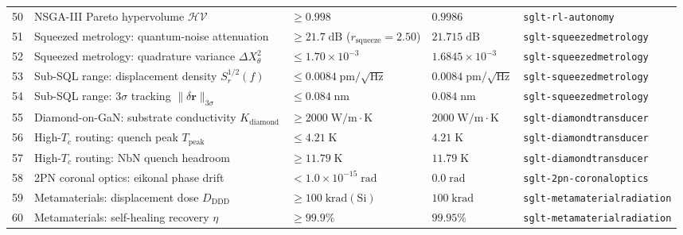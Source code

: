 \documentclass[10pt,twocolumn]{IEEEtran}
\begin{document}
\begin{table}[t]
\begin{tabular}{@{}cp{4.3cm}p{3.5cm}p{3.3cm}p{3.6cm}@{}}
50 & NSGA-III Pareto hypervolume $\mathcal{HV}$ & $\geq0.998$ & $0.9986$ & \texttt{sglt-rl-autonomy} \\
51 & Squeezed metrology: quantum-noise attenuation & $\geq21.7\;\mathrm{dB}$ ($r_{\mathrm{squeeze}}=2.50$) & $21.715\;\mathrm{dB}$ & \texttt{sglt-squeezed}\newline\texttt{metrology} \\
52 & Squeezed metrology: quadrature variance $\Delta X_\theta^{2}$ & $\leq1.70\times10^{-3}$ & $1.6845\times10^{-3}$ & \texttt{sglt-squeezed}\newline\texttt{metrology} \\
53 & Sub-SQL range: displacement density $S_r^{1/2}(f)$ & $\leq0.0084\;\mathrm{pm}/\sqrt{\mathrm{Hz}}$ & $0.0084\;\mathrm{pm}/\sqrt{\mathrm{Hz}}$ & \texttt{sglt-squeezed}\newline\texttt{metrology} \\
54 & Sub-SQL range: $3\sigma$ tracking $\|\delta\mathbf{r}\|_{3\sigma}$ & $\leq0.084\;\mathrm{nm}$ & $0.084\;\mathrm{nm}$ & \texttt{sglt-squeezed}\newline\texttt{metrology} \\
55 & Diamond-on-GaN: substrate conductivity $K_{\mathrm{diamond}}$ & $\geq2000\;\mathrm{W/m\cdot K}$ & $2000\;\mathrm{W/m\cdot K}$ & \texttt{sglt-diamond}\newline\texttt{transducer} \\
56 & High-$T_c$ routing: quench peak $T_{\mathrm{peak}}$ & $\leq4.21\;\mathrm{K}$ & $4.21\;\mathrm{K}$ & \texttt{sglt-diamond}\newline\texttt{transducer} \\
57 & High-$T_c$ routing: NbN quench headroom & $\geq11.79\;\mathrm{K}$ & $11.79\;\mathrm{K}$ & \texttt{sglt-diamond}\newline\texttt{transducer} \\
58 & 2PN coronal optics: eikonal phase drift & $<1.0\times10^{-15}\;\mathrm{rad}$ & $0.0\;\mathrm{rad}$ & \texttt{sglt-2pn-coronal}\newline\texttt{optics} \\
59 & Metamaterials: displacement dose $D_{\mathrm{DDD}}$ & $\geq100\;\mathrm{krad(Si)}$ & $100\;\mathrm{krad}$ & \texttt{sglt-metamaterial}\newline\texttt{radiation} \\
60 & Metamaterials: self-healing recovery $\eta$ & $\geq99.9\%$ & $99.95\%$ & \texttt{sglt-metamaterial}\newline\texttt{radiation} \\

\end{tabular}
\end{table}
\end{document}
